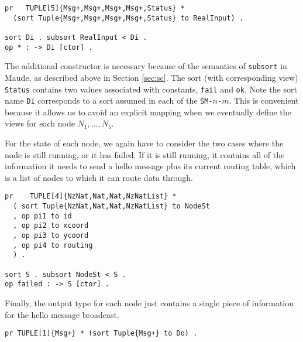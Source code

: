 \documentclass[copyright,creativecommons]{eptcs}
\begin{document}
\begin{center}
\begin{small}
\begin{boxedminipage}{0.75\textwidth}
\begin{verbatim}
pr   TUPLE[5]{Msg+,Msg+,Msg+,Msg+,Status} * 
  (sort Tuple{Msg+,Msg+,Msg+,Msg+,Status} to RealInput) .

sort Di . subsort RealInput < Di .
op * : -> Di [ctor] .
\end{verbatim}
\end{boxedminipage}
\end{small}
\end{center}

\noindent
The additional constructor {\tt *} is necessary because of the semantics of
{\tt subsort} in Maude, as described above in Section \ref{sec:sc}. The sort
(with corresponding view) {\tt Status} contains two values associated with
constants, {\tt fail} and {\tt ok}. Note the sort name {\tt Di} corresponds to
a sort assumed in each of the {\tt SM-$n$-$m$}. This is convenient because it
allows us to avoid an explicit mapping when we eventually define the views for
each node $N_1,\dotsc,N_5$.

For the state of each node, we again have to consider the two cases where the
node is still running, or it has failed. If it is still running, it contains
all of the information it needs to send a hello message plus its current
routing table, which is a list of nodes to which it can route data through.

\begin{center}
\begin{small}
\begin{boxedminipage}{0.60\textwidth}
\begin{verbatim}
pr    TUPLE[4]{NzNat,Nat,Nat,NzNatList} *
  ( sort Tuple{NzNat,Nat,Nat,NzNatList} to NodeSt
  , op pi1 to id
  , op pi2 to xcoord
  , op pi3 to ycoord
  , op pi4 to routing
  ) .

sort S . subsort NodeSt < S .
op failed : -> S [ctor] .
\end{verbatim}
\end{boxedminipage}
\end{small}
\end{center}

Finally, the output type for each node just contains a single piece of
information for the hello message broadcast.


\begin{center}
\begin{small}
\begin{boxedminipage}{0.55\textwidth}
\begin{verbatim}
pr TUPLE[1]{Msg+} * (sort Tuple{Msg+} to Do) .
\end{verbatim}
\end{boxedminipage}
\end{small}
\end{center}
\end{document}
